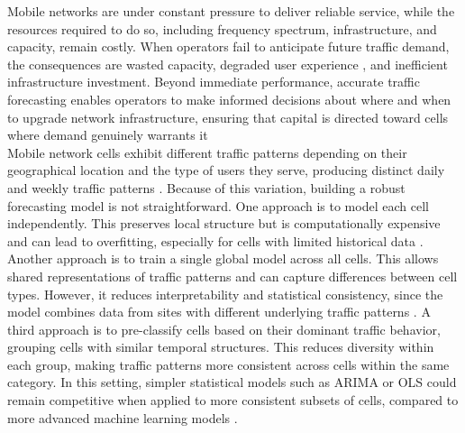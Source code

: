 

Mobile networks are under constant pressure to deliver reliable service, while the resources required to do so, including frequency spectrum, infrastructure, and capacity, remain costly. When operators fail to anticipate future traffic demand, the consequences are wasted capacity, degraded user experience \cite{upgrade_infastructure}, and inefficient infrastructure investment. Beyond immediate performance, accurate traffic forecasting enables operators to make informed decisions about where and when to upgrade network infrastructure, ensuring that capital is directed toward cells where demand genuinely warrants it \\



Mobile network cells exhibit different traffic patterns depending on their geographical location and the type of users they serve, producing distinct daily and weekly traffic patterns \cite{wang2015understanding}. Because of this variation, building a robust forecasting model is not straightforward. One approach is to model each cell independently. This preserves local structure but is computationally expensive and can lead to overfitting, especially for cells with limited historical data \cite{global_vs_split}. Another approach is to train a single global model across all cells. This allows shared representations of traffic patterns and can capture differences between cell types. However, it reduces interpretability and statistical consistency, since the model combines data from sites with different underlying traffic patterns \cite{global_vs_split}. A third approach is to pre-classify cells based on their dominant traffic behavior, grouping cells with similar temporal structures. This reduces diversity within each group, making traffic patterns more consistent across cells within the same category. In this setting, simpler statistical models such as ARIMA or OLS could remain competitive when applied to more consistent subsets of cells, compared to more advanced machine learning models \cite{busy_hour_forecasting}. \\

